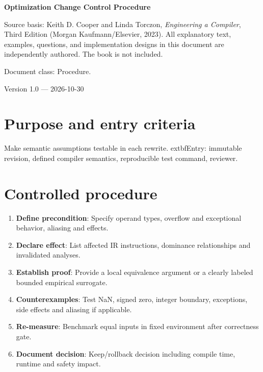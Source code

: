 \documentclass[10pt,letterpaper]{article}
\begin{document}
\hypersetup{pageanchor=false}%
\begin{titlepage}
\centering\vspace*{1.0in}
{\Huge\bfseries\textcolor{CompilerBlue}{Optimization Change Control Procedure}\par}
\vspace{.22in}{\Large Controlled engineering SOP\par}
\vspace{.4in}{\large Compiler Engineering Documentation Suite\par}
\vfill
\begin{minipage}{.86\linewidth}\small
Source basis: Keith D. Cooper and Linda Torczon, \emph{Engineering a Compiler}, Third Edition (Morgan Kaufmann/Elsevier, 2023). All explanatory text, examples, questions, and implementation designs in this document are independently authored. The book is not included.\par\medskip
Document class: Procedure.
\end{minipage}
\vfill\textcolor{CompilerGray}{Version 1.0 --- 2026-10-30}\par
\end{titlepage}\hypersetup{pageanchor=true}
\tableofcontents\clearpage
\section{Purpose and entry criteria}
Make semantic assumptions testable in each rewrite.
	extbf{Entry:} immutable revision, defined compiler semantics, reproducible test command, reviewer.

\section{Controlled procedure}
\begin{enumerate}
\item \textbf{Define precondition}: Specify operand types, overflow and exceptional behavior, aliasing and effects.
\item \textbf{Declare effect}: List affected IR instructions, dominance relationships and invalidated analyses.
\item \textbf{Establish proof}: Provide a local equivalence argument or a clearly labeled bounded empirical surrogate.
\item \textbf{Counterexamples}: Test NaN, signed zero, integer boundary, exceptions, side effects and aliasing if applicable.
\item \textbf{Re-measure}: Benchmark equal inputs in fixed environment after correctness gate.
\item \textbf{Document decision}: Keep/rollback decision including compile time, runtime and safety impact.
\end{enumerate}
\end{document}
